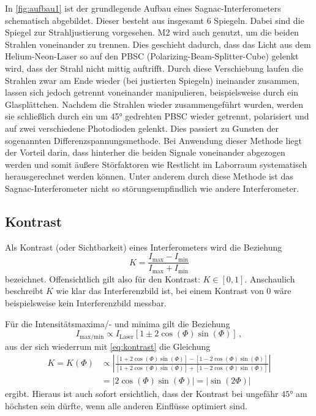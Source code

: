 In \autoref{fig:aufbau1} ist der grundlegende Aufbau eines Sagnac-Interferometers schematisch abgebildet.
Dieser besteht aus insgesamt 6 Spiegeln.
Dabei sind die Spiegel zur Strahljustierung vorgesehen.
M2 wird auch genutzt, um die beiden Strahlen voneinander zu trennen.
Dies geschieht dadurch, dass das Licht aus dem Helium-Neon-Laser so auf den PBSC (Polarizing-Beam-Splitter-Cube) gelenkt wird, 
dass der Strahl nicht mittig auftrifft.
Durch diese Verschiebung laufen die Strahlen zwar am Ende wieder (bei justierten Spiegeln) ineinander zusammen, 
lassen sich jedoch getrennt voneinander manipulieren, beispielsweise durch ein Glasplättchen.
Nachdem die Strahlen wieder zusammengeführt wurden, 
werden sie schließlich durch ein um 45° gedrehten PBSC wieder getrennt, polarisiert und auf zwei verschiedene Photodioden gelenkt.
Dies passiert zu Gunsten der sogenannten Differenzspannungsmethode.
Bei Anwendung dieser Methode liegt der Vorteil darin, 
dass hinterher die beiden Signale voneinander abgezogen werden und somit äußere Störfaktoren wie Restlicht im Laborraum systematisch herausgerechnet werden können.
Unter anderem durch diese Methode ist das Sagnac-Interferometer nicht so störungsempfindlich wie andere Interferometer. 

\subsection{Kontrast} \label{sec:kontrast}
Als Kontrast (oder Sichtbarkeit) eines Interferometers wird die Beziehung
\begin{equation} \label{eqn:kontrast}
    K = \frac{I_\text{max} - I_\text{min}}{I_\text{max} + I_\text{min}}
\end{equation}
bezeichnet. Offensichtlich gilt also für den Kontrast: $K \in [0,1]$.
Anschaulich beschreibt $K$ wie klar das Interferenzbild ist, bei einem Kontrast von $0$ wäre beispielsweise kein Interferenzbild messbar.

Für die Intensitätsmaxima/- und minima gilt die Beziehung \cite{v64}
\begin{equation*}
    I_\text{max/min} \propto I_\text{Laser} \left[ 1 \pm 2 \cos(\Phi) \sin (\Phi) \right] \, ,
\end{equation*}
aus der sich wiederrum mit \autoref{eq:kontrast} die Gleichung
\begin{align}\label{eqn:kontrast2}
    K = K(\Phi) &\propto \left|\frac{\left[ 1 + 2 \cos(\Phi) \sin (\Phi) \right] - \left[ 1 - 2 \cos(\Phi) \sin (\Phi) \right]}{\left[ 1 + 2 \cos(\Phi) \sin (\Phi) \right] + \left[ 1 - 2 \cos(\Phi) \sin (\Phi) \right]}\right| \\
    &= \left|2 \cos(\Phi) \sin(\Phi) \right| = \left| \sin (2 \Phi) \right|
\end{align}
ergibt. Hieraus ist auch sofort ersichtlich, dass der Kontrast bei ungefähr $45°$ am höchsten sein dürfte, wenn alle anderen Einflüsse optimiert sind.

